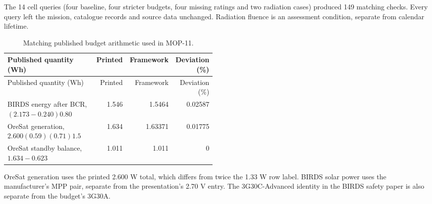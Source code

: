 The 14 cell queries (four baseline, four stricter budgets, four missing ratings and two radiation cases) produced 149 matching checks.
Every query left the mission, catalogue records and source data unchanged.
Radiation fluence is an assessment condition, separate from calendar lifetime.

\begingroup\footnotesize\setlength{\tabcolsep}{3pt}\setlength{\parskip}{0pt}
\begin{longtable}{@{}P{0.49\linewidth}rrr@{}}
\caption{Matching published budget arithmetic used in MOP-11.}\label{tab:cots-case-published-budgets}\\
\toprule
Published quantity (Wh) & Printed & Framework & Deviation (\%) \\ \midrule
\endfirsthead
\toprule
Published quantity (Wh) & Printed & Framework & Deviation (\%) \\ \midrule
\endhead
\bottomrule\endfoot
BIRDS energy after BCR, $(2.173-0.240)0.80$ & 1.546 & 1.5464 & 0.02587 \\
OreSat generation, $2.600(0.59)(0.71)1.5$ & 1.634 & 1.63371 & 0.01775 \\
OreSat standby balance, $1.634-0.623$ & 1.011 & 1.011 & 0 \\
\end{longtable}\endgroup

OreSat generation uses the printed 2.600 W total, which differs from twice the 1.33 W row label.
BIRDS solar power uses the manufacturer's MPP pair, separate from the presentation's 2.70 V entry.
The 3G30C-Advanced identity in the BIRDS safety paper is also separate from the budget's 3G30A.

